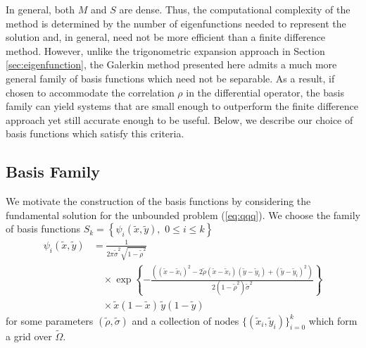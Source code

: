 In general, both $M$ and $S$ are dense. Thus, the computational
complexity of the method is determined by the number of eigenfunctions
needed to represent the solution and, in general, need not be more
efficient than a finite difference method. However, unlike the
trigonometric expansion approach in Section \ref{sec:eigenfunction},
the Galerkin method presented here admits a much more general family
of basis functions which need not be separable. As a result, if chosen
to accommodate the correlation $\rho$ in the differential operator,
the basis family can yield systems that are small enough to outperform
the finite difference approach yet still accurate enough to be useful.
Below, we describe our choice of basis functions which satisfy this
criteria.


\subsection{Basis Family} \label{sec:basis-family}
We motivate the construction of the basis functions by considering the
fundamental solution for the unbounded problem (\ref{eq:qqq}). We
choose the family of basis functions
$S_k = \left\{\psi_i(\tilde{x},\tilde{y}), \,\, 0 \leq i \leq k
\right\}$
\begin{align}
  \psi_i(\tilde{x},\tilde{y}) &= \frac{1}{2\pi \tilde{\sigma}^2\sqrt{1-\tilde{\rho}^2} } \\
                              &\quad \times \exp\left\{ -\frac{\left( (\tilde{x} - \tilde{x}_i)^2 - 2\tilde{\rho} (\tilde{x}-\tilde{x}_i)(\tilde{y}-\tilde{y}_i) + (\tilde{y} - \tilde{y}_i)^2 \right)}{2(1-\tilde{\rho}^2)\tilde{\sigma}^2}  \right\} \nonumber \\
  &\quad \times \tilde{x}\left(1-\tilde{x}\right)\, \tilde{y}(1-\tilde{y}) \nonumber
\end{align}
for some parameters $(\tilde{\rho}, \tilde{\sigma})$ and a collection of nodes
$\{ (\tilde{x}_i,\tilde{y}_i) \}_{i=0}^k$ which form a grid over
$\tilde{\Omega}$.

